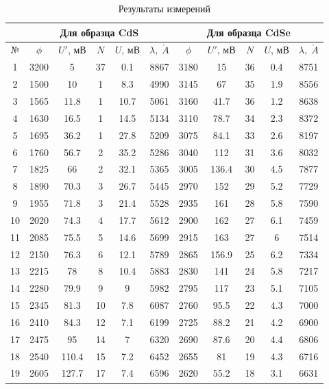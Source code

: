 \documentclass[12pt]{kiarticle}
\newcommand{\an}{\ensuremath{\mathring{A}}}
\begin{document}
	\begin{table}[h]
		\caption{Результаты измерений}
		\begin{center}
			\begin{tabular}{|c|ccccc|ccccc|}
				\hline
				& \multicolumn{5}{|c|}{Для образца CdS} & \multicolumn{5}{|c|}{Для образца CdSe} \\
				\hline
				№ & $ \phi  $ & $ U' $, мВ &  $ N $ & $ U $, мВ & $ \lambda, \; \an $ &  $ \phi  $ & $ U' $, мВ &  $ N $ & $ U $, мВ & $ \lambda, \; \an $ \\
				\hline
				 1 & 3200 & 5 & 37 & 0.1 & 8867 & 3180 & 15 & 36 & 0.4 & 8751 \\
				2 & 1500 & 10 & 1 & 8.3 & 4990 & 3145 & 67 & 35 & 1.9 & 8556 \\
				3 & 1565 & 11.8 & 1 & 10.7 & 5061 & 3160 & 41.7 & 36 & 1.2 & 8638 \\
				4 & 1630 & 16.5 & 1 & 14.5 & 5134 & 3110 & 78.7 & 34 & 2.3 & 8372 \\
				5 & 1695 & 36.2 & 1 & 27.8 & 5209 & 3075 & 84.1 & 33 & 2.6 & 8197 \\
				6 & 1760 & 56.7 & 2 & 35.2 & 5286 & 3040 & 112 & 31 & 3.6 & 8032 \\
				7 & 1825 & 66 & 2 & 32.1 & 5365 & 3005 & 136.4 & 30 & 4.5 & 7877 \\
				8 & 1890 & 70.3 & 3 & 26.7 & 5445 & 2970 & 152 & 29 & 5.2 & 7729 \\
				9 & 1955 & 71.8 & 3 & 21.4 & 5528 & 2935 & 161 & 28 & 5.8 & 7590 \\
				10 & 2020 & 74.3 & 4 & 17.7 & 5612 & 2900 & 162 & 27 & 6.1 & 7459 \\
				11 & 2085 & 75.5 & 5 & 14.6 & 5699 & 2915 & 163 & 27 & 6 & 7514 \\
				12 & 2150 & 76.3 & 6 & 12.1 & 5789 & 2865 & 156.9 & 25 & 6.2 & 7334 \\
				13 & 2215 & 78 & 8 & 10.4 & 5883 & 2830 & 141 & 24 & 5.8 & 7217 \\
				14 & 2280 & 79.9 & 9 & 9 & 5982 & 2795 & 117 & 23 & 5.1 & 7105 \\
				15 & 2345 & 81.3 & 10 & 7.8 & 6087 & 2760 & 95.5 & 22 & 4.3 & 7000 \\
				16 & 2410 & 84.3 & 12 & 7.1 & 6199 & 2725 & 88.2 & 21 & 4.2 & 6900 \\
				17 & 2475 & 95 & 14 & 7 & 6320 & 2690 & 87.6 & 20 & 4.4 & 6806 \\
				18 & 2540 & 110.4 & 15 & 7.2 & 6452 & 2655 & 81 & 19 & 4.3 & 6716 \\
				19 & 2605 & 127.7 & 17 & 7.4 & 6596 & 2620 & 55.2 & 18 & 3.1 & 6631 \\

\end{tabular}
\end{center}
\end{table}
\end{document}
